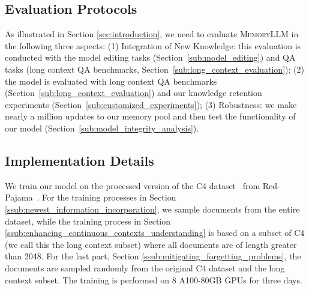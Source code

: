 \documentclass{article}
\theoremstyle{plain}
\theoremstyle{definition}
\theoremstyle{remark}
\newcommand{\ours}{\textsc{MemoryLLM}\xspace}
\newcommand{\wy}[1]{{\color{black}{#1}}}
\begin{document}
\subsection{Evaluation Protocols}
\vspace{-5pt}
As illustrated in Section \ref{sec:introduction}, we need to evaluate \ours in the following three aspects: (1) Integration of New Knowledge: this evaluation is conducted with the model editing tasks (Section~\ref{sub:model_editing}) and QA tasks (long context QA benchmarks, Section~\ref{sub:long_context_evaluation}); 
(2) 
\wy{Knowledge Retention Ability:}
the model is evaluated with long context QA benchmarks (Section~\ref{sub:long_context_evaluation}) and our knowledge retention experiments (Section~\ref{sub:customized_experiments}); (3) Robustness: we make nearly a million updates to our memory pool and then test the functionality of our model (Section~\ref{sub:model_integrity_analysis}).

\vspace{-5pt}
\subsection{Implementation Details}
\vspace{-5pt}
We train our model on the processed version of the C4 dataset~\citep{c4} from Red-Pajama~\citep{together2023redpajama}. For the training processes in Section \ref{ssub:newest_information_incorporation}, we sample documents from the entire dataset, while the training process in Section \ref{ssub:enhancing_continuous_contexts_understanding} is based on a subset of C4 (we call this the long context subset) where all documents are of length greater than 2048. For the last part, Section \ref{ssub:mitigating_forgetting_problems}, the documents are sampled randomly from the original C4 dataset and the long context subset. The training is performed on 8 A100-80GB GPUs for three days.  
\end{document}
